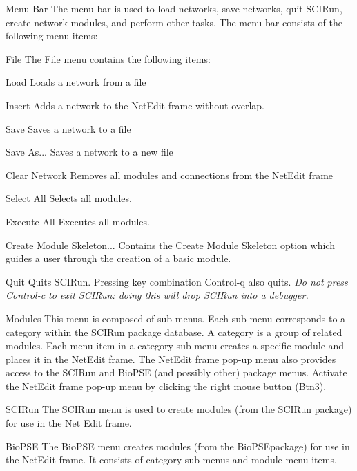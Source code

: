 \documentclass[fleqn,12pt,openany]{book}
\begin{document}
\begin{customdesc}
\item[Menu Bar]
The menu bar is used to load networks, save networks, quit SCIRun, create network modules, and perform other tasks.
The menu bar consists of the following menu items:
  \begin{customdesc}
  \item[File]
  The File menu contains the following items:
    \begin{customdesc}
    \item[Load]
    Loads a network from a file
    \item[Insert]
    Adds a network to the NetEdit frame without overlap.
    \item[Save]
    Saves a network to a file
    \item[Save As...]
    Saves a network to a new file
    \item[Clear Network]
    Removes all modules and connections from the NetEdit frame
    \item[Select All]
    Selects all modules.
    \item[Execute All]
    Executes all modules.
    \item[Create Module Skeleton...]
    Contains the Create Module Skeleton option which guides a user through the creation of a basic module.
    \item[Quit]
    Quits SCIRun.
    Pressing key combination Control-q also quits.
    \emph{Do not press Control-c to exit SCIRun: doing this will drop SCIRun into a debugger.}
    \end{customdesc}
  \end{customdesc}
\item[Modules]
This menu is composed of sub-menus.
Each sub-menu corresponds to a category within the SCIRun package database.
A category is a group of related modules.
Each menu item in a category sub-menu creates a specific module and places it in the NetEdit frame.
The NetEdit frame pop-up menu also provides access to the SCIRun and BioPSE (and possibly other) package menus.
Activate the NetEdit frame pop-up menu by clicking the right mouse button (Btn3).
  \begin{customdesc}
  \item[SCIRun]
  The SCIRun menu is used to create modules (from the SCIRun package) for use in the Net Edit frame.
  \item[BioPSE]
  The BioPSE menu creates modules (from the BioPSEpackage) for use in the NetEdit frame.
  It consists of category sub-menus and module menu items.

\end{customdesc}
\end{customdesc}
\end{document}
